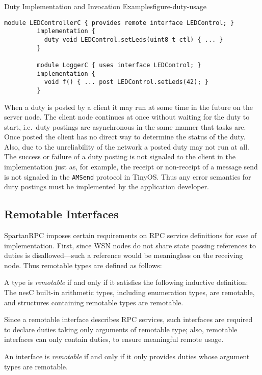 \begin{fpfig}[t]{Duty Implementation and Invocation Examples}{figure-duty-usage}
{
\begin{center}
\vspace{0.5em}
\begin{Verbatim}[fontsize=\small]
         module LEDControllerC { provides remote interface LEDControl; }
         implementation {
           duty void LEDControl.setLeds(uint8_t ctl) { ... }
         } 
 
         module LoggerC { uses interface LEDControl; }
         implementation {
           void f() { ... post LEDControl.setLeds(42); }
         }
\end{Verbatim}
\vspace{0.1em}
\end{center}
}
\end{fpfig}

When a duty is posted by a client it may run at some time in the future on the server node. The
client node continues at once without waiting for the duty to start, i.e.~duty postings are
asynchronous in the same manner that tasks are. Once posted the client has no direct way to
determine the status of the duty. Also, due to the unreliability of the network a posted duty
may not run at all. The success or failure of a duty posting is not signaled to the client in
the implementation just as, for example, the receipt or non-receipt of a message send is not
signaled in the \texttt{AMSend} protocol in TinyOS. Thus any error semantics for duty postings
must be implemented by the application developer.

\subsection{Remotable Interfaces}
\label{section-remotable}

SpartanRPC imposes certain requirements on RPC service definitions for ease of implementation.
First, since WSN nodes do not share state passing references to duties is disallowed---such a
reference would be meaningless on the receiving node. Thus remotable types are defined as
follows:
\begin{definition}A type is \emph{remotable} if and only if it satisfies the following inductive
  definition: The nesC built-in arithmetic types, including enumeration types, are remotable,
  and structures containing remotable types are remotable.
\end{definition}
Since a remotable interface describes RPC services, such interfaces are required to declare
duties taking only arguments of remotable type; also, remotable interfaces can only contain
duties, to ensure meaningful remote usage.
\begin{definition}
  An interface is \emph{remotable} if and only if it only provides duties whose argument types
  are remotable.
\end{definition}

